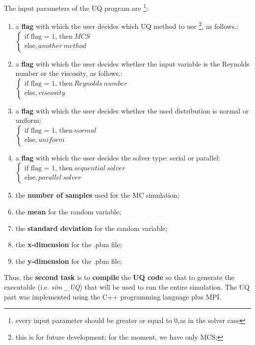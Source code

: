 \documentclass[12pt,a4paper]{article}
\begin{document}
The input parameters of the UQ program are \footnote{every input parameter should be greater or equal to 0,as in the solver case}:
\begin{enumerate}
\item {a \textbf{flag} with which the user decides which UQ method to use \footnote{this is for future development; for the moment, we have only MCS;}, as follows.}: \\
$\left\{
  \begin{array}{ccl}
    \text{if flag = 1, then} \ MCS \\
    \text{else}, another \ method 
  \end{array}
\right.$
\item {a \textbf{flag} with which the user decides whether the input variable is the Reynolds number or the viscosity, as follows.}: \\
$\left\{
  \begin{array}{ccl}
    \text{if flag = 1, then} \ Reynolds \ number \\
    \text{else}, viscosity 
  \end{array}
\right.$
\item {a \textbf{flag} with which the user decides whether the used distribution is normal or uniform}: \\
$\left\{
  \begin{array}{ccl}
    \text{if flag = 1, then} \ normal \\
    \text{else}, uniform 
  \end{array}
\right.$
\item {a \textbf{flag} with which the user decides the solver type: serial or parallel}: \\
$\left\{
  \begin{array}{ccl}
    \text{if flag = 1, then} \ sequential\ solver \\
    \text{else}, parallel\ solver
  \end{array}
\right.$
\item {the \textbf{number of samples} used for the MC simulation};
\item {the \textbf{mean} for the random variable};
\item {the \textbf{standard deviation} for the random variable};
\item {the \textbf{x-dimension} for the .pbm file};
\item {the \textbf{y-dimension} for the .pbm file};
\end{enumerate}
Thus, the \textbf{second task} is to \textbf{compile} the \textbf{UQ code} so that to generate the executable (i.e. \emph{sim \_UQ})  that will be used to run the entire simulation.
The UQ part was implemented using the C++ programming language plus MPI. \\
\end{document}

